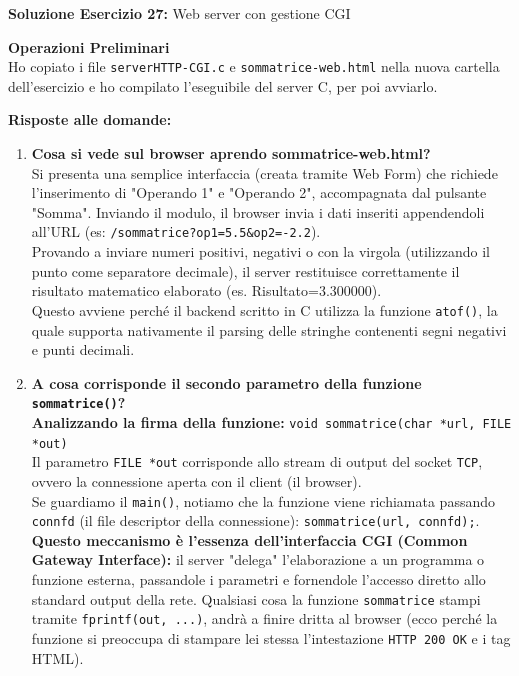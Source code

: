 \documentclass[11pt]{article}
\begin{document}
\begin{tcolorbox}[colback=green!5!white,colframe=green!75!black,title=\textbf{RISPOSTA}, breakable]
\textbf{Soluzione Esercizio 27:} Web server con gestione CGI

\textbf{Operazioni Preliminari}\\
Ho copiato i file \texttt{serverHTTP-CGI.c} e \texttt{sommatrice-web.html} nella nuova cartella dell'esercizio e ho compilato l'eseguibile del server C, per poi avviarlo.

\textbf{Risposte alle domande:}

\begin{enumerate}
    \item \textbf{Cosa si vede sul browser aprendo sommatrice-web.html?}\\
    Si presenta una semplice interfaccia (creata tramite Web Form) che richiede l'inserimento di "Operando 1" e "Operando 2", accompagnata dal pulsante "Somma". Inviando il modulo, il browser invia i dati inseriti appendendoli all'URL (es: \texttt{/sommatrice?op1=5.5\&op2=-2.2}).\\
    Provando a inviare numeri positivi, negativi o con la virgola (utilizzando il punto come separatore decimale), il server restituisce correttamente il risultato matematico elaborato (es. Risultato=3.300000).\\
    Questo avviene perché il backend scritto in C utilizza la funzione \texttt{atof()}, la quale supporta nativamente il parsing delle stringhe contenenti segni negativi e punti decimali.

    \item \textbf{A cosa corrisponde il secondo parametro della funzione \texttt{sommatrice()}?}\\
    \textbf{Analizzando la firma della funzione:} \texttt{void sommatrice(char *url, FILE *out)}\\
    Il parametro \texttt{FILE *out} corrisponde allo stream di output del socket \texttt{TCP}, ovvero la connessione aperta con il client (il browser). \\
    Se guardiamo il \texttt{main()}, notiamo che la funzione viene richiamata passando \texttt{connfd} (il file descriptor della connessione): \texttt{sommatrice(url, connfd);}.\\
    \textbf{Questo meccanismo è l'essenza dell'interfaccia CGI (Common Gateway Interface):} il server "delega" l'elaborazione a un programma o funzione esterna, passandole i parametri e fornendole l'accesso diretto allo standard output della rete. Qualsiasi cosa la funzione \texttt{sommatrice} stampi tramite \texttt{fprintf(out, ...)}, andrà a finire dritta al browser (ecco perché la funzione si preoccupa di stampare lei stessa l'intestazione \texttt{HTTP 200 OK} e i tag HTML).
\end{enumerate}


\end{tcolorbox}
\end{document}
